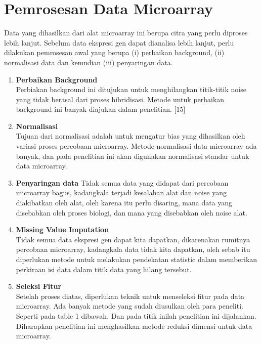 \section{Pemrosesan Data Microarray}
Data yang dihasilkan dari alat microarray ini berupa citra yang perlu diproses lebih lanjut. Sebelum data ekspresi gen dapat dianalisa lebih lanjut, perlu dilakukan pemrosesan awal yang berupa (i) perbaikan background, (ii) normalisasi data dan kemudian (iii) penyaringan data.
\begin{enumerate}
\item{\textbf{Perbaikan Background}}\\
Perbiakan background ini ditujukan untuk menghilangkan titik-titik noise yang tidak berasal dari proses hibridisasi. Metode untuk perbaikan background ini banyak diajukan dalam penelitian. [15]
\item{\textbf{Normalisasi}}\\
Tujuan dari normalisasi adalah untuk mengatur bias yang dihasilkan oleh variasi proses percobaan microarray. Metode normalisasi data microarray ada banyak, dan pada penelitian ini akan digunakan normalisasi standar untuk data microarray.
\item{\textbf{Penyaringan data}}
Tidak semua data yang didapat dari percobaan microarray bagus, kadangkala terjadi kesalahan alat dan noise yang diakibatkan oleh alat, oleh karena itu perlu disaring, mana data yang disebabkan oleh proses biologi, dan mana yang disebabkan oleh noise alat.
\item{\textbf{Missing Value Imputation}}\\
Tidak semua data ekspresi gen dapat kita dapatkan, dikarenakan rumitnya percobaan microarray, kadangkala data tidak kita dapatkan, oleh sebab itu diperlukan metode untuk melakukan pendekatan statistic dalam memberikan perkiraan isi data dalam titik data yang hilang tersebut.
\item{\textbf{Seleksi Fitur}}\\
Setelah proses diatas, diperlukan teknik untuk menseleksi fitur pada data microarray. Ada banyak metode yang sudah diusulkan oleh para peneliti. Seperti pada table 1 dibawah. Dan pada titik inilah penelitian ini dijalankan. Diharapkan penelitian ini menghasilkan metode reduksi dimensi untuk data microarray.

\end{enumerate}

